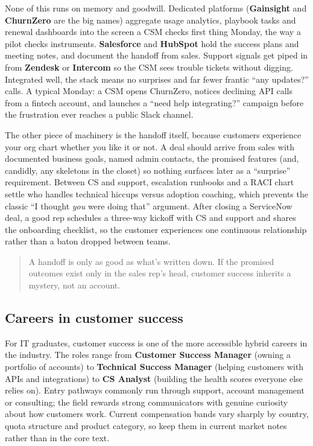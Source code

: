 None of this runs on memory and goodwill. Dedicated platforms (\textbf{Gainsight} and \textbf{ChurnZero} are the big names) aggregate usage analytics, playbook tasks and renewal dashboards into the screen a CSM checks first thing Monday, the way a pilot checks instruments. \textbf{Salesforce} and \textbf{HubSpot} hold the success plans and meeting notes, and document the handoff from sales. Support signals get piped in from \textbf{Zendesk} or \textbf{Intercom} so the CSM sees trouble tickets without digging. Integrated well, the stack means no surprises and far fewer frantic ``any updates?'' calls. A typical Monday: a CSM opens ChurnZero, notices declining API calls from a fintech account, and launches a ``need help integrating?'' campaign before the frustration ever reaches a public Slack channel.


The other piece of machinery is the handoff itself, because customers experience your org chart whether you like it or not. A deal should arrive from sales with documented business goals, named admin contacts, the promised features (and, candidly, any skeletons in the closet) so nothing surfaces later as a ``surprise'' requirement. Between CS and support, escalation runbooks and a RACI chart settle who handles technical hiccups versus adoption coaching, which prevents the classic ``I thought \emph{you} were doing that'' argument. After closing a ServiceNow deal, a good rep schedules a three-way kickoff with CS and support and shares the onboarding checklist, so the customer experiences one continuous relationship rather than a baton dropped between teams.



\begin{quote}\small
A handoff is only as good as what's written down. If the promised outcomes exist only in the sales rep's head, customer success inherits a mystery, not an account.
\end{quote}



\subsection{Careers in customer success}


For IT graduates, customer success is one of the more accessible hybrid careers in the industry. The roles range from \textbf{Customer Success Manager} (owning a portfolio of accounts) to \textbf{Technical Success Manager} (helping customers with APIs and integrations) to \textbf{CS Analyst} (building the health scores everyone else relies on). Entry pathways commonly run through support, account management or consulting; the field rewards strong communicators with genuine curiosity about how customers work. Current compensation bands vary sharply by country, quota structure and product category, so keep them in current market notes rather than in the core text.


